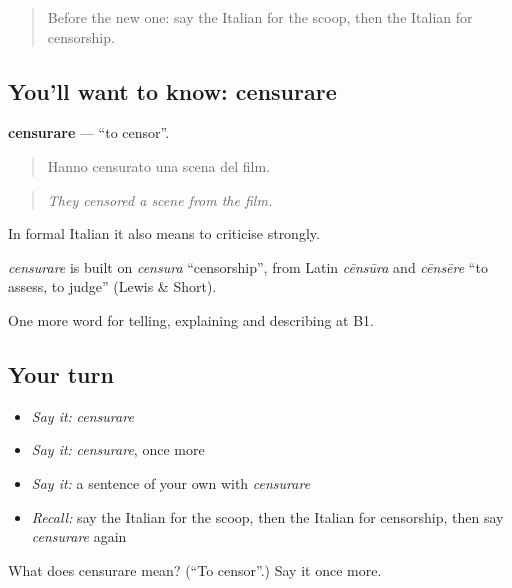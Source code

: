 \label{lesson:IT-C286-censurare}



\begin{quote}
Before the new one: say the Italian for the scoop, then the Italian for censorship.
\end{quote}

\subsection*{You'll want to know: censurare}
\textbf{censurare} — \textquotedblleft{}to censor\textquotedblright{}.

\begin{quote}
Hanno censurato una scena del film.
\end{quote}

\begin{quote}
\emph{They censored a scene from the film.}
\end{quote}

In formal Italian it also means to criticise strongly.

\begin{cousinweb}
\emph{censurare} is built on \emph{censura} \textquotedblleft{}censorship\textquotedblright{}, from Latin \emph{cēnsūra} and \emph{cēnsēre} \textquotedblleft{}to assess, to judge\textquotedblright{} (Lewis \& Short).
\end{cousinweb}

\begin{grammarlens}[title={What you've built}]
One more word for telling, explaining and describing at B1.
\end{grammarlens}

\subsection*{Your turn}
\begin{itemize}
\raggedright
  \item \emph{Say it:} \emph{censurare}
  \item \emph{Say it:} \emph{censurare}, once more
  \item \emph{Say it:} a sentence of your own with \emph{censurare}
  \item \emph{Recall:} say the Italian for the scoop, then the Italian for censorship, then say \emph{censurare} again
\end{itemize}

\begin{tcolorbox}[breakable,colback=teal!4,colframe=teal!35!black,title={Before you move on}]
What does censurare mean? (\textquotedblleft{}To censor\textquotedblright{}.) Say it once more.
\end{tcolorbox}
